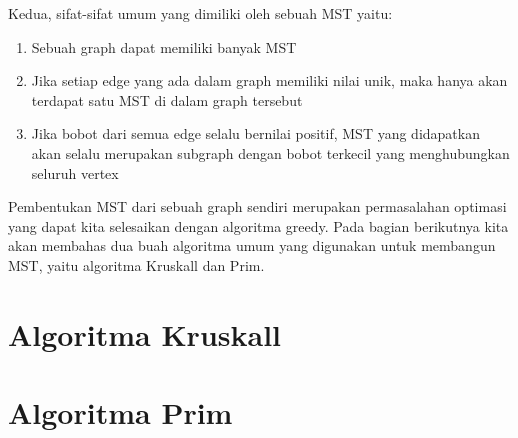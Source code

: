 Kedua, sifat-sifat umum yang dimiliki oleh sebuah MST yaitu:

\begin{enumerate}
    \item Sebuah graph dapat memiliki banyak MST
    \item Jika setiap edge yang ada dalam graph memiliki nilai unik, maka hanya akan terdapat satu MST di dalam graph tersebut
    \item Jika bobot dari semua edge selalu bernilai positif, MST yang didapatkan akan selalu merupakan subgraph dengan bobot terkecil yang menghubungkan seluruh vertex
\end{enumerate}

Pembentukan MST dari sebuah graph sendiri merupakan permasalahan optimasi yang dapat kita selesaikan dengan algoritma greedy. Pada bagian berikutnya kita akan membahas dua buah algoritma umum yang digunakan untuk membangun MST, yaitu algoritma Kruskall dan Prim.

\section{Algoritma Kruskall}

\section{Algoritma Prim}
